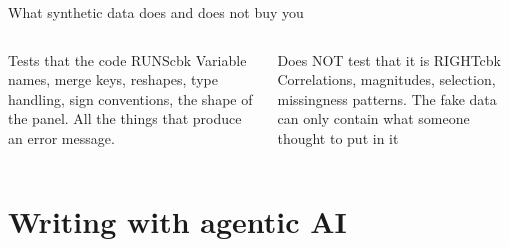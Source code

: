 \documentclass[aspectratio=169, 10pt]{beamer}
\begin{document}



\begin{frame}{What synthetic data does and does not buy you}
\vskip0.1cm
\begin{columns}[t]
\begin{mckcardg}[mckteal]{Tests that the code RUNS}{cbk}
\footnotesize
Variable names, merge keys, reshapes, type handling, sign conventions, the
shape of the panel. All the things that produce an error message. 
\end{mckcardg}

\begin{mckcardg}[mcknavy]{Does NOT test that it is RIGHT}{cbk}
\footnotesize
Correlations, magnitudes, selection, missingness patterns. The fake data can only contain what someone thought to put in it
\end{mckcardg}
\end{columns}

\end{frame}



\section{Writing with agentic AI}
\sourceline{}
\end{document}
